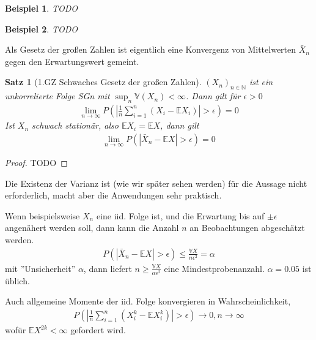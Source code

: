 \documentclass[]{article}
\newtheorem{theorem}{Satz}
\newtheorem*{example}{Beispiel}
\begin{document}
\begin{example}
	TODO
\end{example}

\begin{example}
	TODO
\end{example}

Als Gesetz der großen Zahlen ist eigentlich eine Konvergenz von Mittelwerten $\bar{X}_n$ gegen den Erwartungswert gemeint.

\begin{theorem}[1.GZ Schwaches Gesetz der großen Zahlen]
	$(X_n)_{n\in \mathbb{N}}$ ist ein unkorrelierte Folge SGn mit $\sup_n \mathbb{V}(X_n) < \infty$. Dann gilt für $\epsilon > 0$
	\begin{align*}
		\lim\limits_{n\rightarrow\infty} P\left(\left|\frac{1}{n} \sum_{i=1}^{n} (X_i - \mathbb{E}X_i)\right| > \epsilon\right) = 0
	\end{align*}
	Ist $X_n$ schwach stationär, also $\mathbb{E}X_i = \mathbb{E}X$, dann gilt
	\begin{align*}
		\lim\limits_{n\rightarrow\infty} P\left(\left|\bar{X}_n - \mathbb{E}X\right| > \epsilon \right) = 0
	\end{align*}
\end{theorem}

\begin{proof}
	TODO
\end{proof}

Die Existenz der Varianz ist (wie wir später sehen werden) für die Aussage nicht erforderlich, macht aber die Anwendungen sehr praktisch.

Wenn beispielsweise $X_n$ eine iid. Folge ist, und die Erwartung bis auf $\pm\epsilon$ angenähert werden soll, dann kann die Anzahl $n$ an Beobachtungen abgeschätzt werden.
\begin{align*}
	P(|\bar{X}_n - \mathbb{E}X| > \epsilon) \leq \frac{\mathbb{V}X}{n\epsilon^2} = \alpha
\end{align*}
mit ''Unsicherheit'' $\alpha$, dann liefert $n \geq \frac{\mathbb{V}X}{\alpha\epsilon^2}$ eine Mindestprobenanzahl. $\alpha = 0.05$ ist üblich.

Auch allgemeine Momente der iid. Folge konvergieren in Wahrscheinlichkeit,
\begin{align*}
	P\left(\left|\frac{1}{n} \sum_{i=1}^{n} (X_i^k - \mathbb{E}X_i^k)\right| > \epsilon \right) \rightarrow 0, n\rightarrow\infty
\end{align*}
wofür $\mathbb{E}X^{2k}<\infty$ gefordert wird.
\end{document}
